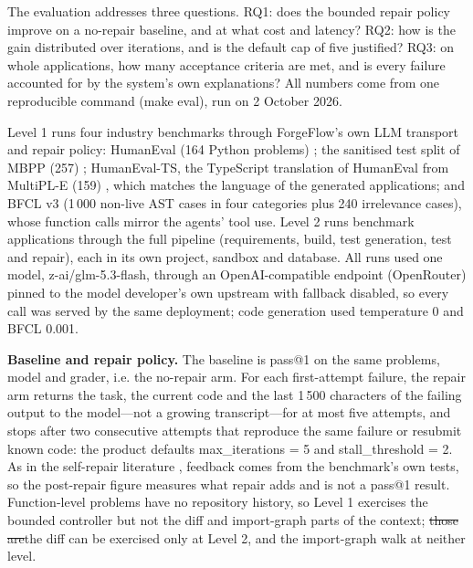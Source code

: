 \documentclass[pdflatex,sn-mathphys-num]{sn-jnl}%
\newcommand{\fix}[1]{{\color{fixcol}#1}}
\newcommand{\fixdel}[1]{{\color{fixcol}\sout{#1}}}
\theoremstyle{thmstyleone}%
\theoremstyle{thmstyletwo}%
\theoremstyle{thmstylethree}%
\begin{document}
The evaluation addresses three questions. RQ1: does the bounded repair policy improve on a no-repair baseline, and at what cost and latency? RQ2: how is the gain distributed over iterations, and is the default cap of five justified? RQ3: on whole applications, how many acceptance criteria are met, and is every failure accounted for by the system's own explanations? All numbers come from one reproducible command (make eval), run on 2 October 2026.

Level 1 runs four industry benchmarks through ForgeFlow's own LLM transport and repair policy: HumanEval (164 Python problems) \cite{r25chen}; the sanitised test split of MBPP (257) \cite{r26austin}; HumanEval-TS, the TypeScript translation of HumanEval from MultiPL-E (159) \cite{r27cassano}, which matches the language of the generated applications; and BFCL v3 \cite{r28patil} (1\,000 non-live AST cases in four categories plus 240 irrelevance cases), whose function calls mirror the agents' tool use. Level 2 runs benchmark applications through the full pipeline (requirements, build, test generation, test and repair), each in its own project, sandbox and database. All runs used one model, z-ai/glm-5.3-flash, through an OpenAI-compatible endpoint (OpenRouter) pinned to the model developer's own upstream with fallback disabled, so every call was served by the same deployment; code generation used temperature 0 and BFCL 0.001.

\textbf{Baseline and repair policy.} The baseline is pass@1 on the same problems, model and grader, i.e. the no-repair arm. For each first-attempt failure, the repair arm returns the task, the current code and the last 1\,500 characters of the failing output to the model---not a growing transcript---for at most five attempts, and stops after two consecutive attempts that reproduce the same failure or resubmit known code: the product defaults max\_iterations = 5 and stall\_threshold = 2. As in the self-repair literature \cite{r29chen,r30olausson}, feedback comes from the benchmark's own tests, so the post-repair figure measures what repair adds and is not a pass@1 result. Function-level problems have no repository history, so Level 1 exercises the bounded controller but not the diff and import-graph parts of the context; \fixdel{those are}\fix{the diff can be} exercised only at Level 2\fix{, and the import-graph walk at neither level}.%
\end{document}
